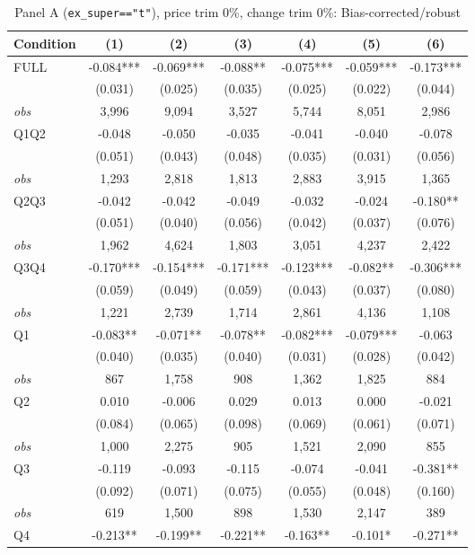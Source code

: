 \begin{table}[!htbp]
\centering
\caption{Panel A (\texttt{ex\_super=="t"}), price trim 0\%, change trim 0\%: Bias-corrected/robust}
\label{tab:a:trim00:robust}
\small
\begin{tabular}{lcccccc}
\toprule
Condition & (1) & (2) & (3) & (4) & (5) & (6) \\
\midrule
FULL & -0.084*** & -0.069*** & -0.088** & -0.075*** & -0.059*** & -0.173*** \\
 & (0.031) & (0.025) & (0.035) & (0.025) & (0.022) & (0.044) \\
\textit{obs} & 3,996 & 9,094 & 3,527 & 5,744 & 8,051 & 2,986 \\
Q1Q2 & -0.048 & -0.050 & -0.035 & -0.041 & -0.040 & -0.078 \\
 & (0.051) & (0.043) & (0.048) & (0.035) & (0.031) & (0.056) \\
\textit{obs} & 1,293 & 2,818 & 1,813 & 2,883 & 3,915 & 1,365 \\
Q2Q3 & -0.042 & -0.042 & -0.049 & -0.032 & -0.024 & -0.180** \\
 & (0.051) & (0.040) & (0.056) & (0.042) & (0.037) & (0.076) \\
\textit{obs} & 1,962 & 4,624 & 1,803 & 3,051 & 4,237 & 2,422 \\
Q3Q4 & -0.170*** & -0.154*** & -0.171*** & -0.123*** & -0.082** & -0.306*** \\
 & (0.059) & (0.049) & (0.059) & (0.043) & (0.037) & (0.080) \\
\textit{obs} & 1,221 & 2,739 & 1,714 & 2,861 & 4,136 & 1,108 \\
Q1 & -0.083** & -0.071** & -0.078** & -0.082*** & -0.079*** & -0.063 \\
 & (0.040) & (0.035) & (0.040) & (0.031) & (0.028) & (0.042) \\
\textit{obs} &   867 & 1,758 &   908 & 1,362 & 1,825 &   884 \\
Q2 & 0.010 & -0.006 & 0.029 & 0.013 & 0.000 & -0.021 \\
 & (0.084) & (0.065) & (0.098) & (0.069) & (0.061) & (0.071) \\
\textit{obs} & 1,000 & 2,275 &   905 & 1,521 & 2,090 &   855 \\
Q3 & -0.119 & -0.093 & -0.115 & -0.074 & -0.041 & -0.381** \\
 & (0.092) & (0.071) & (0.075) & (0.055) & (0.048) & (0.160) \\
\textit{obs} &   619 & 1,500 &   898 & 1,530 & 2,147 &   389 \\
Q4 & -0.213** & -0.199** & -0.221** & -0.163** & -0.101* & -0.271** \\

\end{tabular}
\end{table}
